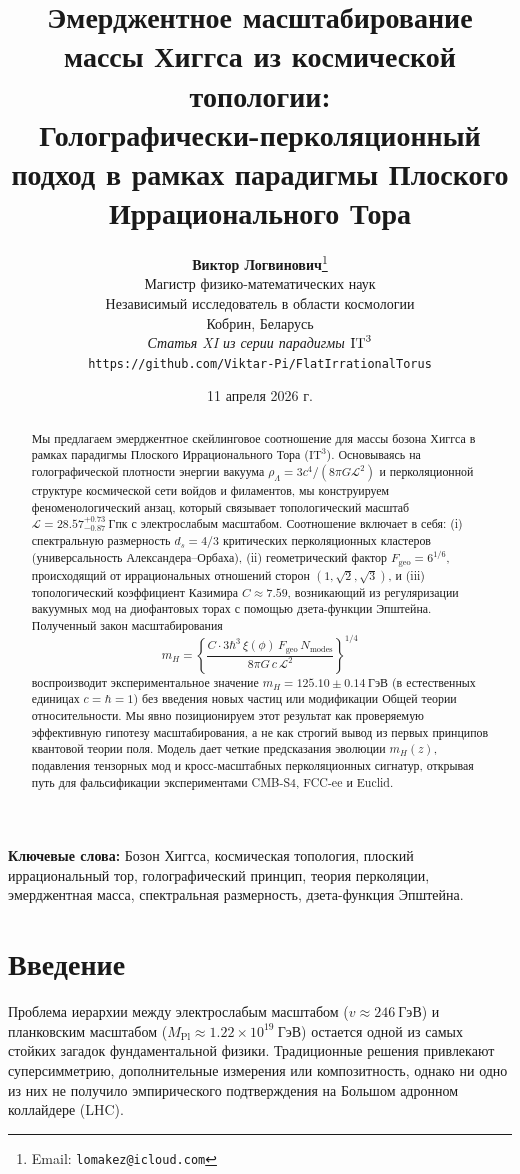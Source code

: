 \documentclass[11pt,a4paper]{article}
\title{
    \vspace{-2em}
    \textbf{Эмерджентное масштабирование массы Хиггса из космической топологии:}\\
    \large Голографически-перколяционный подход в рамках парадигмы Плоского Иррационального Тора
    \vspace{0.5em}
}
\author{
    \textbf{Виктор Логвинович}\thanks{Email: \texttt{lomakez@icloud.com}}\\
    \small Магистр физико-математических наук\\
    \small Независимый исследователь в области космологии\\
    \small Кобрин, Беларусь\\[1em]
    \small \textit{Статья XI из серии парадигмы $\ITthree$}\\
    \small \texttt{https://github.com/Viktar-Pi/FlatIrrationalTorus}
}
\date{11 апреля 2026 г.}
\newcommand{\ITthree}{\ensuremath{\mathrm{IT}^3}}
\newcommand{\Ltop}{\ensuremath{\mathcal{L}}}
\newcommand{\rhoLambda}{\ensuremath{\rho_\Lambda}}
\newcommand{\xiPhi}{\ensuremath{\xi(\phi)}}
\newcommand{\Fgeo}{\ensuremath{F_{\mathrm{geo}}}}
\newcommand{\Nmodes}{\ensuremath{N_{\mathrm{modes}}}}
\begin{document}
\maketitle

\begin{abstract}
\noindent
Мы предлагаем эмерджентное скейлинговое соотношение для массы бозона Хиггса в рамках парадигмы Плоского Иррационального Тора ($\ITthree$). Основываясь на голографической плотности энергии вакуума $\rhoLambda = 3c^4/(8\pi G \Ltop^2)$ и перколяционной структуре космической сети войдов и филаментов, мы конструируем феноменологический анзац, который связывает топологический масштаб $\Ltop = 28.57^{+0.73}_{-0.87}~\mathrm{Гпк}$ с электрослабым масштабом. Соотношение включает в себя: (i) спектральную размерность $d_s = 4/3$ критических перколяционных кластеров (универсальность Александера--Орбаха), (ii) геометрический фактор $\Fgeo = 6^{1/6}$, происходящий от иррациональных отношений сторон $(1,\sqrt{2},\sqrt{3})$, и (iii) топологический коэффициент Казимира $C \approx 7.59$, возникающий из регуляризации вакуумных мод на диофантовых торах с помощью дзета-функции Эпштейна. Полученный закон масштабирования
\[
m_H = \left\{ \frac{C \cdot 3\hbar^3 \, \xiPhi \, \Fgeo \, \Nmodes}{8\pi G \, c \, \Ltop^2} \right\}^{1/4}
\]
воспроизводит экспериментальное значение $m_H = 125.10 \pm 0.14~\mathrm{ГэВ}$ (в естественных единицах $c=\hbar=1$) без введения новых частиц или модификации Общей теории относительности. Мы явно позиционируем этот результат как проверяемую эффективную гипотезу масштабирования, а не как строгий вывод из первых принципов квантовой теории поля. Модель дает четкие предсказания эволюции $m_H(z)$, подавления тензорных мод и кросс-масштабных перколяционных сигнатур, открывая путь для фальсификации экспериментами CMB-S4, FCC-ee и Euclid.
\end{abstract}

\textbf{Ключевые слова:} Бозон Хиггса, космическая топология, плоский иррациональный тор, голографический принцип, теория перколяции, эмерджентная масса, спектральная размерность, дзета-функция Эпштейна.

\section{Введение}
\label{sec:intro}

Проблема иерархии между электрослабым масштабом ($v \approx 246~\mathrm{ГэВ}$) и планковским масштабом ($M_{\mathrm{Pl}} \approx 1.22 \times 10^{19}~\mathrm{ГэВ}$) остается одной из самых стойких загадок фундаментальной физики. Традиционные решения привлекают суперсимметрию, дополнительные измерения или композитность, однако ни одно из них не получило эмпирического подтверждения на Большом адронном коллайдере (LHC).
\end{document}
